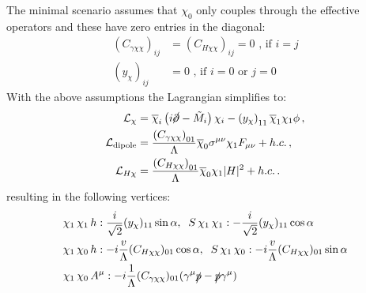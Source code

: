 \documentclass[a4paper,11pt]{article}
\begin{document}
The minimal scenario assumes that $\chi_0$ only couples through the effective operators and these have zero entries in the diagonal:
\begin{align}
	(C_{\gamma\chi\chi})_{ij} &= (C_{H\chi\chi})_{ij} = 0 \mbox{ , if $i = j$} \\
	(y_{\chi})_{ij} & = 0 \mbox{ , if $i = 0$ or $j = 0$ }
\end{align}
With the above assumptions the Lagrangian simplifies to:
\begin{align}
	\mathcal{L}_\chi &=  \overline{\chi}_i \left( i \cancel \partial -\tilde{M}_i\right) \chi_i - \left(y_\chi\right)_{11} \overline{\chi}_1 \chi_1 \phi \,, \\
	\mathcal{L}_{\rm dipole} &= \frac{\left(C_{\gamma \chi \chi}\right)_{01}}{\Lambda} \overline{\chi}_0 \sigma^{\mu\nu} \chi_1 F_{\mu\nu} + h.c. \,,\\
	\mathcal{L}_{H\chi} &= \frac{\left(C_{H \chi \chi}\right)_{01}}{\Lambda} \overline{\chi}_0 \chi_1 |H|^2 + h.c. \,.
\end{align}
resulting in the following vertices:
\begin{align}
& \chi_1\,\chi_1\,h  : \frac{i}{\sqrt{2}} (y_{\chi})_{11} \sin\alpha,\;\;
S\,\chi_1\,\chi_1  : -\frac{i}{\sqrt{2}} (y_{\chi})_{11} \cos\alpha \\    
& \chi_1\,\chi_0\,h  : -i \frac{v}{\Lambda} (C_{H\chi\chi})_{01} \cos\alpha,\;\; S\,\chi_1\,\chi_0 :  -i \frac{v}{\Lambda} (C_{H\chi\chi})_{01} \sin\alpha \\
& \chi_1\,\chi_0\, A^\mu  : -i \frac{1}{\Lambda} (C_{\gamma\chi\chi})_{01} (\gamma^\mu \slashed{p} - \slashed{p} \gamma^\mu)
\end{align}

%
%
\end{document}
